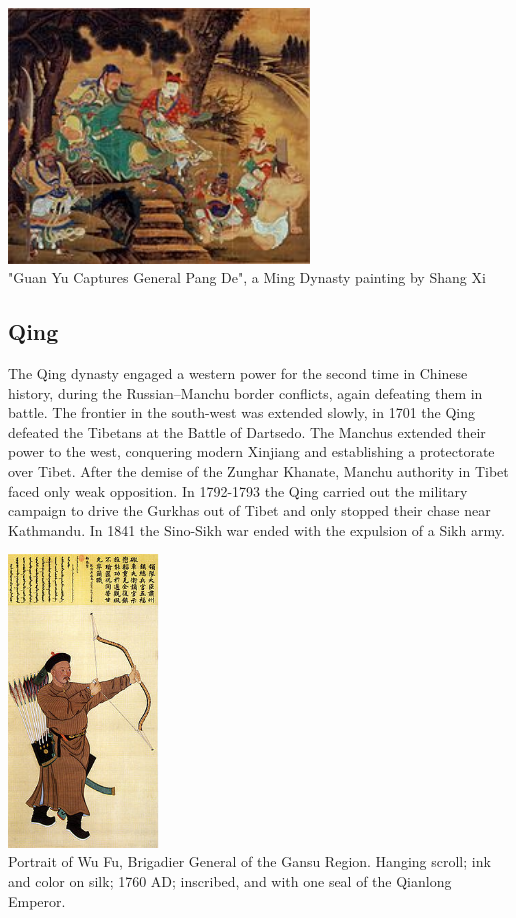 \documentclass[compress]{beamer}
\begin{document}
\begin{frame}
\begin{center}
\includegraphics[width = 0.60\textwidth]{military-en/i.JPG} \\
"Guan Yu Captures General Pang De", a Ming Dynasty painting by Shang Xi
\end{center}
\end{frame}

\begin{frame}
\subsection{Qing}
The Qing dynasty engaged a western power for the second time in Chinese history, during the Russian–Manchu border conflicts, again defeating them in battle. The frontier in the south-west was extended slowly, in 1701 the Qing defeated the Tibetans at the Battle of Dartsedo. The Manchus extended their power to the west, conquering modern Xinjiang and establishing a protectorate over Tibet. After the demise of the Zunghar Khanate, Manchu authority in Tibet faced only weak opposition. In 1792-1793 the Qing carried out the military campaign to drive the Gurkhas out of Tibet and only stopped their chase near Kathmandu. In 1841 the Sino-Sikh war ended with the expulsion of a Sikh army.
\end{frame}

\begin{frame}
\begin{center}
\includegraphics[width = 0.30\textwidth]{military-en/j.jpg} \\
Portrait of Wu Fu, Brigadier General of the Gansu Region. Hanging scroll; ink and color on silk; 1760 AD; inscribed, and with one seal of the Qianlong Emperor.
\end{center}
\end{frame}
\end{document}
